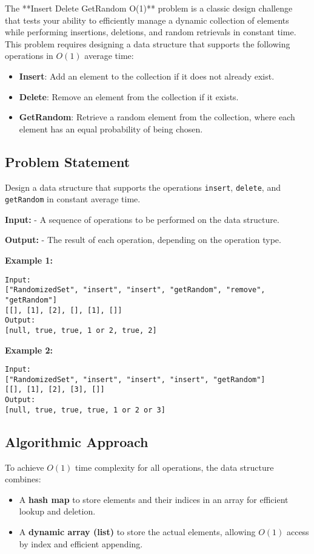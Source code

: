 
\label{problem:Insert_Delete_GetRandom}

The **Insert Delete GetRandom O(1)** problem is a classic design challenge that tests your ability to efficiently manage a dynamic collection of elements while performing insertions, deletions, and random retrievals in constant time. This problem requires designing a data structure that supports the following operations in \(O(1)\) average time:

\begin{itemize}
    \item \textbf{Insert}: Add an element to the collection if it does not already exist.
    \item \textbf{Delete}: Remove an element from the collection if it exists.
    \item \textbf{GetRandom}: Retrieve a random element from the collection, where each element has an equal probability of being chosen.
\end{itemize}

\subsection*{Problem Statement}
Design a data structure that supports the operations \texttt{insert}, \texttt{delete}, and \texttt{getRandom} in constant average time.

\textbf{Input:}
- A sequence of operations to be performed on the data structure.

\textbf{Output:}
- The result of each operation, depending on the operation type.

\textbf{Example 1:}
\begin{verbatim}
Input:
["RandomizedSet", "insert", "insert", "getRandom", "remove", "getRandom"]
[[], [1], [2], [], [1], []]
Output:
[null, true, true, 1 or 2, true, 2]
\end{verbatim}

\textbf{Example 2:}
\begin{verbatim}
Input:
["RandomizedSet", "insert", "insert", "insert", "getRandom"]
[[], [1], [2], [3], []]
Output:
[null, true, true, true, 1 or 2 or 3]
\end{verbatim}

\subsection*{Algorithmic Approach}
To achieve \(O(1)\) time complexity for all operations, the data structure combines:
\begin{itemize}
    \item A \textbf{hash map} to store elements and their indices in an array for efficient lookup and deletion.
    \item A \textbf{dynamic array (list)} to store the actual elements, allowing \(O(1)\) access by index and efficient appending.
\end{itemize}

